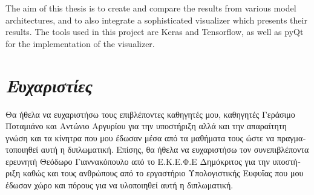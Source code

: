 The aim of this thesis is to create and compare the results from various model architectures, and to also integrate a sophisticated visualizer which presents their results. The tools used in this project are Keras and Tensorflow, as well as pyQt for the implementation of the visualizer.

\chapter*{\centering\emph{\textgreek{Ευχαριστίες}}}
\textgreek{Θα ήθελα να ευχαριστήσω τους επιβλέποντες καθηγητές μου, καθηγητές Γεράσιμο Ποταμιάνο και Αντώνιο Αργυρίου για την υποστήριξη αλλά και την απαραίτητη γνώση και τα κίνητρα που μου έδωσαν μέσα από τα μαθήματα τους ώστε να πραγματοποιηθεί αυτή η διπλωματική. Επίσης, θα ήθελα να ευχαριστήσω τον συνεπιβλέποντα ερευνητή Θεόδωρο Γιαννακόπουλο από το Ε.Κ.Ε.Φ.Ε Δημόκριτος για την υποστήριξη καθώς και τους ανθρώπους από το εργαστήριο Υπολογιστικής Ευφυΐας που μου έδωσαν χώρο και πόρους για να υλοποιηθεί αυτή η διπλωματική.}
